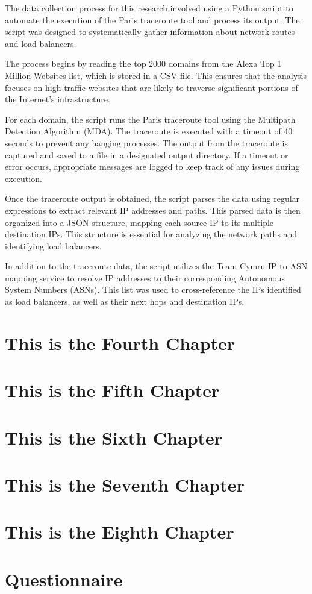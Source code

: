 \documentclass[12pt]{cwru_thesis}
\begin{document}
The data collection process for this research involved using a Python script to automate the execution of the Paris traceroute tool and process its output. The script was designed to systematically gather information about network routes and load balancers.

The process begins by reading the top 2000 domains from the Alexa Top 1 Million Websites list, which is stored in a CSV file. This ensures that the analysis focuses on high-traffic websites that are likely to traverse significant portions of the Internet's infrastructure.

For each domain, the script runs the Paris traceroute tool using the Multipath Detection Algorithm (MDA). The traceroute is executed with a timeout of 40 seconds to prevent any hanging processes. The output from the traceroute is captured and saved to a file in a designated output directory. If a timeout or error occurs, appropriate messages are logged to keep track of any issues during execution.

Once the traceroute output is obtained, the script parses the data using regular expressions to extract relevant IP addresses and paths. This parsed data is then organized into a JSON structure, mapping each source IP to its multiple destination IPs. This structure is essential for analyzing the network paths and identifying load balancers.


In addition to the traceroute data, the script utilizes the Team Cymru IP to ASN mapping service to resolve IP addresses to their corresponding Autonomous System Numbers (ASNs). This list was used to cross-reference the IPs identified as load balancers, as well as their next hops and destination IPs. 



\chapter{This is the Fourth Chapter}
\chapter{This is the Fifth Chapter}
\chapter{This is the Sixth Chapter}
\chapter{This is the Seventh Chapter}
\chapter{This is the Eighth Chapter}


\appendix

\chapter{Questionnaire}

\printbibliography[heading=bibintoc]
\end{document}
